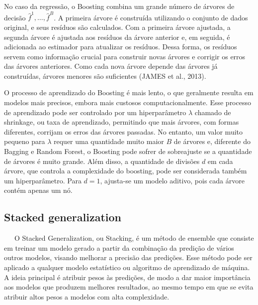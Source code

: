 \documentclass[
  12pt,
  a4paper,
]{scrreprt}
\begin{document}
\vspace{12pt}

No caso da regressão, o Boosting combina um grande número de árvores de
decisão \(\hat{f}^1, \dots, \hat{f}^B\). A primeira árvore é construída
utilizando o conjunto de dados original, e seus resíduos são calculados.
Com a primeira árvore ajustada, a segunda árvore é ajustada aos resíduos
da árvore anterior e, em seguida, é adicionada ao estimador para
atualizar os resíduos. Dessa forma, os resíduos servem como informação
crucial para construir novas árvores e corrigir os erros das árvores
anteriores. Como cada nova árvore depende das árvores já construídas,
árvores menores são suficientes (JAMES et al., 2013).

\vspace{12pt}

O processo de aprendizado do Boosting é mais lento, o que geralmente
resulta em modelos mais precisos, embora mais custosos
computacionalmente. Esse processo de aprendizado pode ser controlado por
um hiperparâmetro \(\lambda\) chamado de shrinkage, ou taxa de
aprendizado, permitindo que mais árvores, com formas diferentes,
corrijam os erros das árvores passadas. No entanto, um valor muito
pequeno para \(\lambda\) requer uma quantidade muito maior \(B\) de
árvores e, diferente do Bagging e Random Forest, o Boosting pode sofrer
de sobreajuste se a quantidade de árvores é muito grande. Além disso, a
quantidade de divisões \(d\) em cada árvore, que controla a complexidade
do boosting, pode ser considerada também um hiperparâmetro. Para
\(d = 1\), ajusta-se um modelo aditivo, pois cada árvore contém apenas
um nó.

\subsection{Stacked generalization}\label{stacked-generalization}

~~~O Stacked Generalization, ou Stacking, é um método de ensemble que
consiste em treinar um modelo gerado a partir da combinação da predição
de vários outros modelos, visando melhorar a precisão das predições.
Esse método pode ser aplicado a qualquer modelo estatístico ou algoritmo
de aprendizado de máquina. A ideia principal é atribuir pesos às
predições, de modo a dar maior importância aos modelos que produzem
melhores resultados, ao mesmo tempo em que se evita atribuir altos pesos
a modelos com alta complexidade.

\vspace{12pt}
\end{document}
